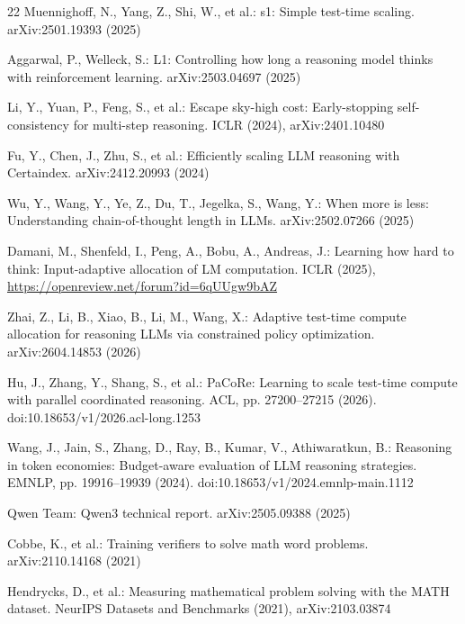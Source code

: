 \documentclass[runningheads]{llncs}
\begin{document}
{\begin{thebibliography}{22}
Muennighoff, N., Yang, Z., Shi, W., et al.: s1: Simple test-time scaling.
arXiv:2501.19393 (2025)

Aggarwal, P., Welleck, S.: L1: Controlling how long a reasoning model thinks
with reinforcement learning. arXiv:2503.04697 (2025)

Li, Y., Yuan, P., Feng, S., et al.: Escape sky-high cost: Early-stopping
self-consistency for multi-step reasoning. ICLR (2024), arXiv:2401.10480

Fu, Y., Chen, J., Zhu, S., et al.: Efficiently scaling LLM reasoning with
Certaindex. arXiv:2412.20993 (2024)

Wu, Y., Wang, Y., Ye, Z., Du, T., Jegelka, S., Wang, Y.: When more is less:
Understanding chain-of-thought length in LLMs. arXiv:2502.07266 (2025)

Damani, M., Shenfeld, I., Peng, A., Bobu, A., Andreas, J.: Learning how hard to
think: Input-adaptive allocation of LM computation. ICLR (2025),
\url{https://openreview.net/forum?id=6qUUgw9bAZ}

Zhai, Z., Li, B., Xiao, B., Li, M., Wang, X.: Adaptive test-time compute
allocation for reasoning LLMs via constrained policy optimization.
arXiv:2604.14853 (2026)

Hu, J., Zhang, Y., Shang, S., et al.: PaCoRe: Learning to scale test-time
compute with parallel coordinated reasoning. ACL,
pp. 27200--27215 (2026). doi:10.18653/v1/2026.acl-long.1253

Wang, J., Jain, S., Zhang, D., Ray, B., Kumar, V., Athiwaratkun, B.:
Reasoning in token economies: Budget-aware evaluation of LLM reasoning
strategies. EMNLP, pp. 19916--19939 (2024).
doi:10.18653/v1/2024.emnlp-main.1112

Qwen Team: Qwen3 technical report. arXiv:2505.09388 (2025)

Cobbe, K., et al.: Training verifiers to solve math word problems.
arXiv:2110.14168 (2021)

Hendrycks, D., et al.: Measuring mathematical problem solving with the MATH
dataset. NeurIPS Datasets and Benchmarks (2021), arXiv:2103.03874

\end{thebibliography}
}
\end{document}
